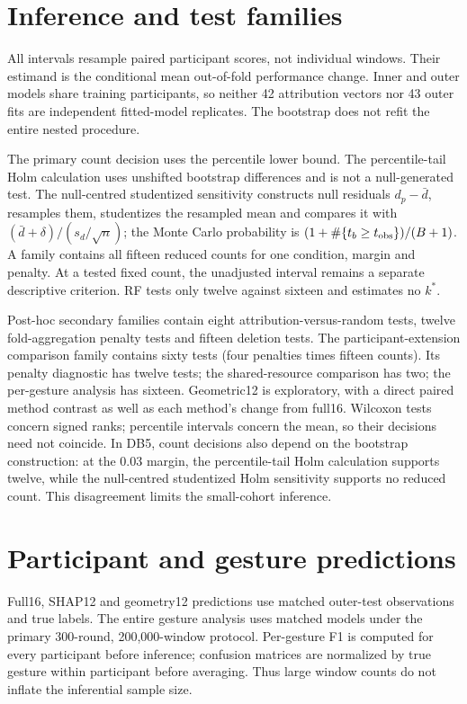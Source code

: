 \documentclass{iopjournal}
\begin{document}
\section{Inference and test families}
All intervals resample paired participant scores, not individual windows. Their estimand is the conditional mean out-of-fold performance change. Inner and outer models share training participants, so neither 42 attribution vectors nor 43 outer fits are independent fitted-model replicates. The bootstrap does not refit the entire nested procedure.

The primary count decision uses the percentile lower bound. The percentile-tail Holm calculation uses unshifted bootstrap differences and is not a null-generated test. The null-centred studentized sensitivity constructs null residuals $d_p-\bar d$, resamples them, studentizes the resampled mean and compares it with $(\bar d+\delta)/(s_d/\sqrt n)$; the Monte Carlo probability is $(1+\#\{t_b\ge t_{\rm obs}\})/(B+1)$. A family contains all fifteen reduced counts for one condition, margin and penalty. At a tested fixed count, the unadjusted interval remains a separate descriptive criterion. RF tests only twelve against sixteen and estimates no $k^*$.

Post-hoc secondary families contain eight attribution-versus-random tests, twelve fold-aggregation penalty tests and fifteen deletion tests. The participant-extension comparison family contains sixty tests (four penalties times fifteen counts). Its penalty diagnostic has twelve tests; the shared-resource comparison has two; the per-gesture analysis has sixteen. Geometric12 is exploratory, with a direct paired method contrast as well as each method's change from full16. Wilcoxon tests concern signed ranks; percentile intervals concern the mean, so their decisions need not coincide. In DB5, count decisions also depend on the bootstrap construction: at the 0.03 margin, the percentile-tail Holm calculation supports twelve, while the null-centred studentized Holm sensitivity supports no reduced count. This disagreement limits the small-cohort inference.

\section{Participant and gesture predictions}
Full16, SHAP12 and geometry12 predictions use matched outer-test observations and true labels. The entire gesture analysis uses matched models under the primary 300-round, 200,000-window protocol. Per-gesture F1 is computed for every participant before inference; confusion matrices are normalized by true gesture within participant before averaging. Thus large window counts do not inflate the inferential sample size.
\end{document}
